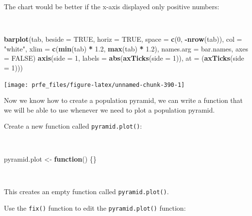 \documentclass[12pt,a4paper]{book}
\newenvironment{Shaded}{\begin{snugshade}}{\end{snugshade}}
\newcommand{\KeywordTok}[1]{\textcolor[rgb]{0.13,0.29,0.53}{\textbf{#1}}}
\newcommand{\DataTypeTok}[1]{\textcolor[rgb]{0.13,0.29,0.53}{#1}}
\newcommand{\DecValTok}[1]{\textcolor[rgb]{0.00,0.00,0.81}{#1}}
\newcommand{\FloatTok}[1]{\textcolor[rgb]{0.00,0.00,0.81}{#1}}
\newcommand{\StringTok}[1]{\textcolor[rgb]{0.31,0.60,0.02}{#1}}
\newcommand{\OtherTok}[1]{\textcolor[rgb]{0.56,0.35,0.01}{#1}}
\newcommand{\ControlFlowTok}[1]{\textcolor[rgb]{0.13,0.29,0.53}{\textbf{#1}}}
\newcommand{\OperatorTok}[1]{\textcolor[rgb]{0.81,0.36,0.00}{\textbf{#1}}}
\newcommand{\NormalTok}[1]{#1}
\theoremstyle{definition}
\theoremstyle{definition}
\theoremstyle{definition}
\theoremstyle{remark}
\begin{document}
The chart would be better if the x-axis displayed only positive numbers:

~

\begin{Shaded}
\begin{Highlighting}[]
\KeywordTok{barplot}\NormalTok{(tab, }\DataTypeTok{beside =} \OtherTok{TRUE}\NormalTok{, }\DataTypeTok{horiz =} \OtherTok{TRUE}\NormalTok{, }\DataTypeTok{space =} \KeywordTok{c}\NormalTok{(}\DecValTok{0}\NormalTok{, }\OperatorTok{-}\KeywordTok{nrow}\NormalTok{(tab)),}
        \DataTypeTok{col =} \StringTok{"white"}\NormalTok{, }\DataTypeTok{xlim =} \KeywordTok{c}\NormalTok{(}\KeywordTok{min}\NormalTok{(tab) }\OperatorTok{*}\StringTok{ }\FloatTok{1.2}\NormalTok{, }\KeywordTok{max}\NormalTok{(tab) }\OperatorTok{*}\StringTok{ }\FloatTok{1.2}\NormalTok{),}
        \DataTypeTok{names.arg =}\NormalTok{ bar.names, }\DataTypeTok{axes =} \OtherTok{FALSE}\NormalTok{)}
\KeywordTok{axis}\NormalTok{(}\DataTypeTok{side =} \DecValTok{1}\NormalTok{,}
     \DataTypeTok{labels =} \KeywordTok{abs}\NormalTok{(}\KeywordTok{axTicks}\NormalTok{(}\DataTypeTok{side =} \DecValTok{1}\NormalTok{)),}
     \DataTypeTok{at =}\NormalTok{ (}\KeywordTok{axTicks}\NormalTok{(}\DataTypeTok{side =} \DecValTok{1}\NormalTok{)))}
\end{Highlighting}
\end{Shaded}

\newpage

\begin{center}\texttt{[image: prfe\_files/figure-latex/unnamed-chunk-390-1]} \end{center}

Now we know how to create a population pyramid, we can write a function
that we will be able to use whenever we need to plot a population
pyramid.

Create a new function called \texttt{pyramid.plot()}:

~

\begin{Shaded}
\begin{Highlighting}[]
\NormalTok{pyramid.plot <-}\StringTok{ }\ControlFlowTok{function}\NormalTok{() \{\}}
\end{Highlighting}
\end{Shaded}

~

This creates an empty function called \texttt{pyramid.plot()}.

Use the \texttt{fix()} function to edit the \texttt{pyramid.plot()}
function:
\end{document}
